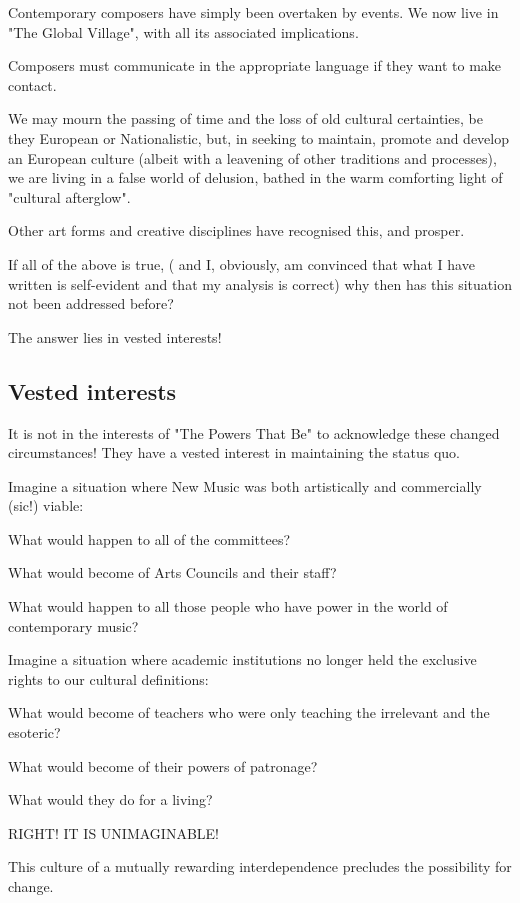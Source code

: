 \documentclass{article}
\begin{document}
Contemporary composers have simply been overtaken by events.
We now live in "The Global Village", with all its associated implications.

Composers must communicate in the appropriate language if they want to make contact.

We may mourn the passing of time and the loss of old cultural certainties, be they European or Nationalistic, but, in seeking to maintain, promote and develop an European culture (albeit with a leavening of other traditions and processes), we are living in a false world of delusion, bathed in the warm comforting light of "cultural afterglow".

Other art forms and creative disciplines have recognised this, and prosper.

If all of the above is true, ( and I, obviously, am convinced that what I have written is self-evident and that my analysis is correct) why then has this situation not been addressed before?

The answer lies in vested interests!

\subsection{Vested interests}

It is not in the interests of "The Powers That Be" to acknowledge these changed circumstances!
They have a vested interest in maintaining the status quo.

Imagine a situation where New Music was both artistically and commercially (sic!) viable:

What would happen to all of the committees?

What would become of Arts Councils and their staff?

What would happen to all those people who have power in the world of contemporary music?

Imagine a situation where academic institutions no longer held the exclusive rights to our cultural definitions:

What would become of teachers who were only teaching the irrelevant and the esoteric?

What would become of their powers of patronage?

What would they do for a living?

RIGHT!
IT IS UNIMAGINABLE!

This culture of a mutually rewarding interdependence precludes the possibility for change.
\end{document}
